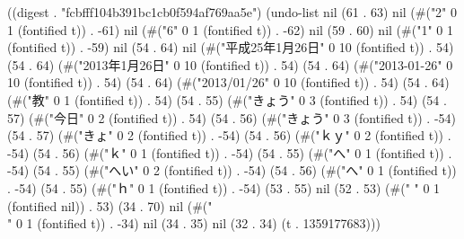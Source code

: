 
((digest . "fcbfff104b391bc1cb0f594af769aa5e") (undo-list nil (61 . 63) nil (#("2" 0 1 (fontified t)) . -61) nil (#("6" 0 1 (fontified t)) . -62) nil (59 . 60) nil (#("1" 0 1 (fontified t)) . -59) nil (54 . 64) nil (#("平成25年1月26日" 0 10 (fontified t)) . 54) (54 . 64) (#("2013年1月26日" 0 10 (fontified t)) . 54) (54 . 64) (#("2013-01-26" 0 10 (fontified t)) . 54) (54 . 64) (#("2013/01/26" 0 10 (fontified t)) . 54) (54 . 64) (#("教" 0 1 (fontified t)) . 54) (54 . 55) (#("きょう" 0 3 (fontified t)) . 54) (54 . 57) (#("今日" 0 2 (fontified t)) . 54) (54 . 56) (#("きょう" 0 3 (fontified t)) . -54) (54 . 57) (#("きょ" 0 2 (fontified t)) . -54) (54 . 56) (#("ｋｙ" 0 2 (fontified t)) . -54) (54 . 56) (#("ｋ" 0 1 (fontified t)) . -54) (54 . 55) (#("へ" 0 1 (fontified t)) . -54) (54 . 55) (#("へい" 0 2 (fontified t)) . -54) (54 . 56) (#("へ" 0 1 (fontified t)) . -54) (54 . 55) (#("ｈ" 0 1 (fontified t)) . -54) (53 . 55) nil (52 . 53) (#(" " 0 1 (fontified nil)) . 53) (34 . 70) nil (#("\\" 0 1 (fontified t)) . -34) nil (34 . 35) nil (32 . 34) (t . 1359177683)))
